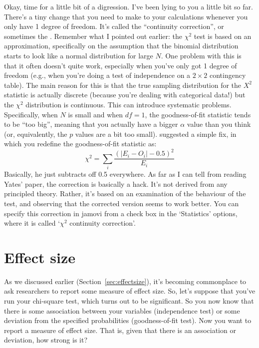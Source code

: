 Okay, time for a little bit of a digression. I've been lying to you a little bit so far. There's a tiny change that you need to make to your calculations whenever you only have 1 degree of freedom. It's called the ``continuity correction'', or sometimes the . Remember what I pointed out earlier: the $\chi^2$ test is based on an approximation, specifically on the assumption that the binomial distribution starts to look like a normal distribution for large $N$. One problem with this is that it often doesn't quite work, especially when you've only got 1 degree of freedom (e.g., when you're doing a test of independence on a $2 \times 2$ contingency table). The main reason for this is that the true sampling distribution for the $X^2$ statistic is actually discrete (because you're dealing with categorical data!) but the $\chi^2$ distribution is continuous. This can introduce systematic problems. Specifically, when $N$ is small and when $df=1$, the goodness-of-fit statistic tends to be ``too big'', meaning that you actually have a bigger $\alpha$ value than you think (or, equivalently, the $p$ values are a bit too small). \textcite{Yates1934} suggested a simple fix, in which you redefine the goodness-of-fit statistic as:
$$
\chi^2 = \sum_{i} \frac{(|E_i - O_i| - 0.5)^2}{E_i}
$$
Basically, he just subtracts off 0.5 everywhere. As far as I can tell from reading Yates' paper, the correction is basically a hack. It's not derived from any principled theory. Rather, it's based on an examination of the behaviour of the test, and observing that the corrected version seems to work better. You can specify this correction in jamovi from a check box in the `Statistics' options, where it is called `$\chi^2$ continuity correction'. 


\section{Effect size~\label{sec:chisqeffectsize}}

As we discussed earlier (Section~\ref{sec:effectsize}), it's becoming commonplace to ask researchers to report some measure of effect size. So, let's suppose that you've run your chi-square test, which turns out to be significant. So you now know that there is some association between your variables (independence test) or some deviation from the specified probabilities (goodness-of-fit test). Now you want to report a measure of effect size. That is, given that there is an association or deviation, how strong is it?

